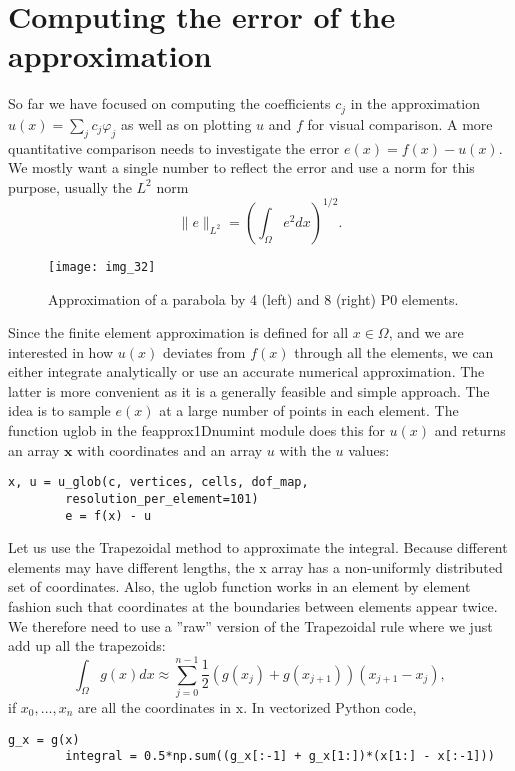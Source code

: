\documentclass[../main.tex]{subfiles}
\begin{document}
	\section[Computing the error of the approximation]{Computing the error of the approximation}
	\label{sec:sec_6_4}
	So far we have focused on computing the coefficients $c_{j}$ in the approximation $u(x)=\sum_{j} c_{j} \varphi_{j}$ as well as on plotting $u$ and $f$ for visual comparison. A more quantitative comparison needs to investigate the error $e(x)=f(x)-u(x)$. We mostly want a single number to reflect the error and use a norm for this purpose, usually the $L^{2}$ norm
	$$
	\|e\|_{L^{2}}=\left(\int_{\Omega} e^{2} d x\right)^{1 / 2}.
	$$
	\begin{figure}[H]
		\centering
		\texttt{[image: img\_32]}
		\caption{Approximation of a parabola by 4 (left) and 8 (right) P0 elements.}
		\label{fig:img_32}
	\end{figure}
	\noindent Since the finite element approximation is defined for all $x \in \Omega$, and we are interested in how $u(x)$ deviates from $f(x)$ through all the elements, we can either integrate analytically or use an accurate numerical approximation. The latter is more convenient as it is a generally feasible and simple approach. The idea is to sample $e(x)$ at a large number of points in each element. The function u\textunderscore glob in the fe\textunderscore approx1D\textunderscore numint module does this for $u(x)$ and returns an array $\mathbf{x}$ with coordinates and an array $u$ with the $u$ values:
	\begin{lstlisting}[numbers=none]
		x, u = u_glob(c, vertices, cells, dof_map,
		resolution_per_element=101)
		e = f(x) - u
	\end{lstlisting}
	Let us use the Trapezoidal method to approximate the integral. Because different
	elements may have different lengths, the x array has a non-uniformly distributed
	set of coordinates. Also, the u\textunderscore glob function works in an element by element
	fashion such that coordinates at the boundaries between elements appear twice.
	We therefore need to use a ”raw” version of the Trapezoidal rule where we just
	add up all the trapezoids:
	$$
	\int_{\Omega} g(x) d x \approx \sum_{j=0}^{n-1} \frac{1}{2}\left(g\left(x_{j}\right)+g\left(x_{j+1}\right)\right)\left(x_{j+1}-x_{j}\right),
	$$
	if $x_{0}, \ldots, x_{n}$ are all the coordinates in $\mathrm{x}$. In vectorized Python code,
	\begin{lstlisting}[numbers=none]
		g_x = g(x)
		integral = 0.5*np.sum((g_x[:-1] + g_x[1:])*(x[1:] - x[:-1]))	
	\end{lstlisting}
\end{document}

